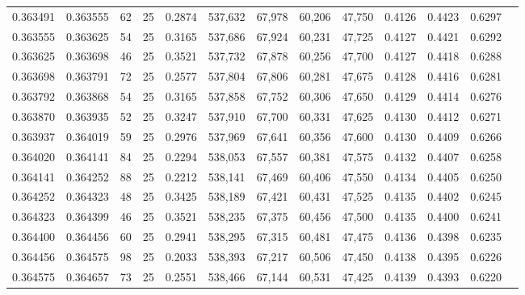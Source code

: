 \begin{tabular}{rrrrrrrrrrrrr}
0.363491 & 0.363555 &    62 &  25 &                                     0.2874 & 537,632 &  67,978 &  60,206 &  47,750 & 0.4126 & 0.4423 & 0.6297 \\
0.363555 & 0.363625 &    54 &  25 &                                     0.3165 & 537,686 &  67,924 &  60,231 &  47,725 & 0.4127 & 0.4421 & 0.6292 \\
0.363625 & 0.363698 &    46 &  25 &                                     0.3521 & 537,732 &  67,878 &  60,256 &  47,700 & 0.4127 & 0.4418 & 0.6288 \\
0.363698 & 0.363791 &    72 &  25 &                                     0.2577 & 537,804 &  67,806 &  60,281 &  47,675 & 0.4128 & 0.4416 & 0.6281 \\
0.363792 & 0.363868 &    54 &  25 &                                     0.3165 & 537,858 &  67,752 &  60,306 &  47,650 & 0.4129 & 0.4414 & 0.6276 \\
0.363870 & 0.363935 &    52 &  25 &                                     0.3247 & 537,910 &  67,700 &  60,331 &  47,625 & 0.4130 & 0.4412 & 0.6271 \\
0.363937 & 0.364019 &    59 &  25 &                                     0.2976 & 537,969 &  67,641 &  60,356 &  47,600 & 0.4130 & 0.4409 & 0.6266 \\
0.364020 & 0.364141 &    84 &  25 &                                     0.2294 & 538,053 &  67,557 &  60,381 &  47,575 & 0.4132 & 0.4407 & 0.6258 \\
0.364141 & 0.364252 &    88 &  25 &                                     0.2212 & 538,141 &  67,469 &  60,406 &  47,550 & 0.4134 & 0.4405 & 0.6250 \\
0.364252 & 0.364323 &    48 &  25 &                                     0.3425 & 538,189 &  67,421 &  60,431 &  47,525 & 0.4135 & 0.4402 & 0.6245 \\
0.364323 & 0.364399 &    46 &  25 &                                     0.3521 & 538,235 &  67,375 &  60,456 &  47,500 & 0.4135 & 0.4400 & 0.6241 \\
0.364400 & 0.364456 &    60 &  25 &                                     0.2941 & 538,295 &  67,315 &  60,481 &  47,475 & 0.4136 & 0.4398 & 0.6235 \\
0.364456 & 0.364575 &    98 &  25 &                                     0.2033 & 538,393 &  67,217 &  60,506 &  47,450 & 0.4138 & 0.4395 & 0.6226 \\
0.364575 & 0.364657 &    73 &  25 &                                     0.2551 & 538,466 &  67,144 &  60,531 &  47,425 & 0.4139 & 0.4393 & 0.6220 \\

\end{tabular}
